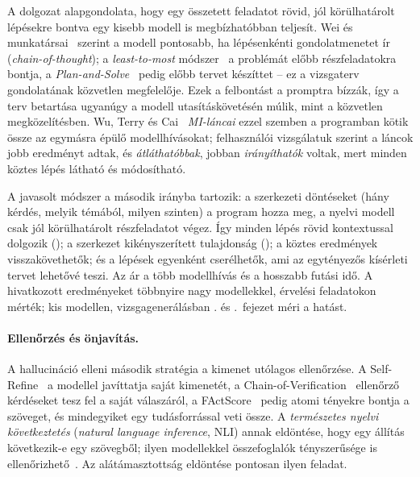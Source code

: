 A dolgozat alapgondolata, hogy egy összetett feladatot rövid, jól körülhatárolt lépésekre bontva egy
kisebb modell is megbízhatóbban teljesít. Wei és munkatársai~\cite{wei2022cot} szerint a modell
pontosabb, ha lépésenkénti gondolatmenetet ír (\emph{chain-of-thought}); a
\emph{least-to-most} módszer~\cite{zhou2023leasttomost} a problémát előbb részfeladatokra bontja, a
\emph{Plan-and-Solve}~\cite{wang2023planandsolve} pedig előbb tervet készíttet -- ez a vizsgaterv
gondolatának közvetlen megfelelője. Ezek a felbontást a promptra bízzák, így a terv betartása ugyanúgy a
modell utasításkövetésén múlik, mint a közvetlen megközelítésben. Wu, Terry és Cai~\cite{wu2022aichains}
\emph{MI-láncai} ezzel szemben a programban kötik össze az egymásra épülő modellhívásokat; felhasználói
vizsgálatuk szerint a láncok jobb eredményt adtak, és \emph{átláthatóbbak}, jobban \emph{irányíthatók}
voltak, mert minden köztes lépés látható és módosítható.

A javasolt módszer a második irányba tartozik: a szerkezeti döntéseket (hány kérdés, melyik témából,
milyen szinten) a program hozza meg, a nyelvi modell csak jól körülhatárolt részfeladatot végez. Így
minden lépés rövid kontextussal dolgozik (); a szerkezet kikényszerített tulajdonság (); a köztes
eredmények visszakövethetők; és a lépések egyenként cserélhetők, ami az egytényezős kísérleti tervet
lehetővé teszi. Az ár a több modellhívás és a hosszabb futási idő. A hivatkozott eredményeket többnyire
nagy modellekkel, érvelési feladatokon mérték; kis modellen, vizsgagenerálásban
\az{\ref{ch:eredmenyek}}. és \az{\ref{ch:modellek}}.~fejezet méri a hatást.

\paragraph{Ellenőrzés és önjavítás.}\label{sec:irod-ellenorzes}
A hallucináció elleni második stratégia a kimenet utólagos ellenőrzése. A Self-Refine~\cite{madaan2023selfrefine}
a modellel javíttatja saját kimenetét, a Chain-of-Verification~\cite{dhuliawala2024cove} ellenőrző
kérdéseket tesz fel a saját válaszáról, a FActScore~\cite{min2023factscore} pedig atomi tényekre bontja a
szöveget, és mindegyiket egy tudásforrással veti össze. A \emph{természetes nyelvi következtetés}
(\emph{natural language inference}, NLI) annak eldöntése, hogy egy állítás következik-e egy szövegből;
ilyen modellekkel összefoglalók tényszerűsége is ellenőrizhető~\cite{laban2022summac}. Az
alátámasztottság eldöntése pontosan ilyen feladat.

